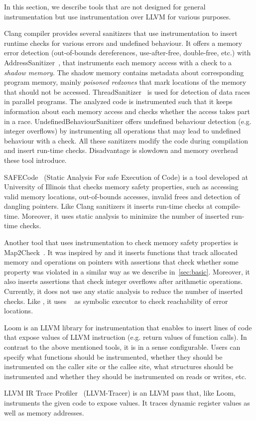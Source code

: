 In this section, we describe tools that are not designed for general
instrumentation but use instrumentation over LLVM for various purposes.

Clang compiler provides several sanitizers that use instrumentation to insert
runtime checks for various errors and undefined behaviour. It offers a memory
error detection (out-of-bounds dereferences, use-after-free, double-free, etc.)
with AddressSanitizer~\cite{asan}, that instruments each memory access with a
check to a \textit{shadow memory}. The shadow memory contains metadata about
corresponding program memory, mainly \textit{poisoned redzones} that mark
locations of the memory that should not be accessed.
ThreadSanitizer~\cite{tsan} is used for detection of data races in parallel
programs. The analyzed code is instrumented such that it keeps information
about each memory access and checks whether the access takes part in a race.
UndefinedBehaviourSanitizer offers undefined behaviour detection (e.g. integer
overflows) by instrumenting all operations that may lead to undefined behaviour
with a check. All these sanitizers modify the code during compilation and
insert run-time checks. Disadvantage is slowdown and memory overhead these tool
introduce.

SAFECode~\cite{safecode} (Static Analysis For safe Execution of Code) is a tool
developed at University of Illinois that checks memory safety properties, such
as accessing valid memory locations, out-of-bounds accesses, invalid frees and
detection of dangling pointers. Like Clang sanitizers it inserts run-time
checks at compile-time. Moreover, it uses static analysis to minimize the
number of inserted run-time checks.

Another tool that uses instrumentation to check memory safety properties is
Map2Check~\cite{map2check}. It was inspired by \symbiotic and it inserts
functions that track allocated memory and operations on pointers with
assertions that check whether some property was violated in a similar way as we
describe in~\ref{sec:basic}. Moreover, it also inserts assertions that check
integer overflows after arithmetic operations. Currently, it does not use any
static analysis to reduce the number of inserted checks. Like \symbiotic, it
uses \klee~\cite{klee} as symbolic executor to check reachability of error
locations.

Loom is an LLVM library for instrumentation that enables to insert lines of
code that expose values of LLVM instruction (e.g. return values of function
calls). In contrast to the above mentioned tools, it is in a sense
configurable. Users can specify what functions should be instrumented, whether
they should be instrumented on the caller site or the callee site, what
structures should be instrumented and whether they should be instrumented on
reads or writes, etc.

LLVM IR Trace Profiler~\cite{tracer} (LLVM-Tracer) is an LLVM pass that, like Loom,
instruments the given code to expose values. It traces dynamic register values
as well as memory addresses.

